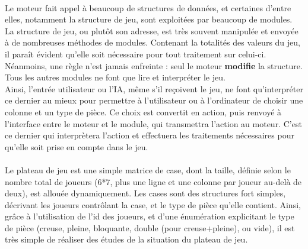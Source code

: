 \documentclass{report}
\begin{document}
        \paragraph*{} %
        Le moteur fait appel à beaucoup de structures de données, et certaines d'entre elles, notamment la structure de jeu, sont exploitées par beaucoup de modules. \\
        La structure de jeu, ou plutôt son adresse, est très souvent manipulée et envoyée à de nombreuses méthodes de modules. Contenant la totalités des valeurs du jeu, il paraît évident
        qu'elle soit nécessaire pour tout traitement sur celui-ci. Néanmoins, une règle n'est jamais enfreinte : seul le moteur \textbf{modifie} la structure. Tous les autres modules ne
        font que lire et interpréter le jeu. \\
        Ainsi, l'entrée utilisateur ou l'IA, même s'il reçoivent le jeu, ne font qu'interpréter ce dernier au mieux pour permettre à 
        l'utilisateur ou à l'ordinateur de choisir une colonne et un type de pièce. Ce choix est convertit en action, puis renvoyé à l'interface entre le moteur et le module, 
        qui transmettra l'action au moteur. C'est ce dernier qui interprètera l'action et effectuera les traitements nécessaires pour qu'elle soit prise en compte dans le jeu. 

        \paragraph*{} %
        Le plateau de jeu est une simple matrice de case, dont la taille, définie selon le nombre total de joueurs (6*7, plus une ligne et une colonne par joueur au-delà de deux), 
        est allouée dynamiquement. Les cases sont des structures fort simples, décrivant les joueurs contrôlant la case, et le type de pièce qu'elle contient.
        Ainsi, grâce à l'utilisation de l'id des joueurs, et d'une énumération explicitant le type de pièce (creuse, pleine, bloquante, double (pour creuse+pleine), ou vide), il est très
        simple de réaliser des études de la situation du plateau de jeu.
\end{document}
